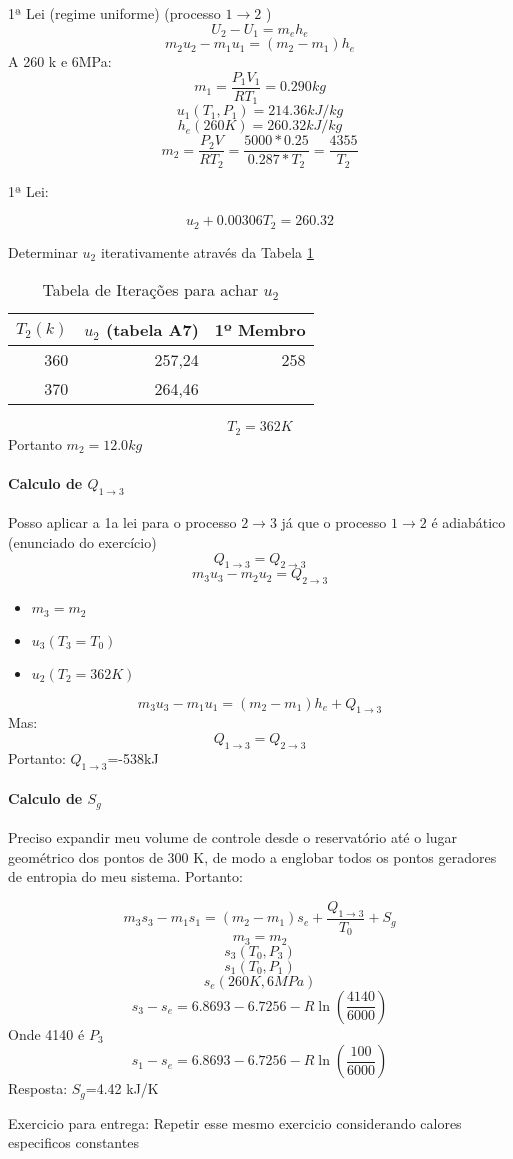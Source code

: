 
1ª Lei (regime uniforme) (processo $1 \rightarrow 2$ )
\[U_{2}-U_{1}=m_{e}h_{e}\]
\[m_{2}u_{2}-m_{1}u_{1}=(m_{2}-m_{1})h_{e}\]
A 260 k e 6MPa:
\[m_{1}=\frac{P_{1}V_{1}}{RT_{1}}=0.290kg\]
\[u_{1}(T_{1},P_{1})=214.36kJ/kg\]
\[h_{e}(260K)=260.32kJ/kg\]
\[m_{2}=\frac{P_{2}V}{RT_{2}}=\frac{5000*0.25}{0.287*T_{2}}=\frac{4355}{T_{2}}\]

1ª Lei:

\[u_{2}+0.00306 T_{2}=260.32\]

Determinar $u_{2}$ iterativamente através da Tabela \ref{tab:tab1}
\begin{table}[htbp]
  \centering
  \caption{Tabela de Iterações para achar $u_{2}$}
    \begin{tabular}{rrr}
    \toprule
    $T_{2}(k)$ & $u_{2}$ (tabela A7) & 1º Membro \\
    \midrule
    360   & 257,24 & 258 \\
    370   & 264,46 &  \\
    \bottomrule
    \end{tabular}%
  \label{tab:tab1}%
\end{table}%

 \[ T_{2}=362 K\]
Portanto $m_{2}=12.0kg$

\paragraph*{Calculo de $Q_{1 \rightarrow 3}$}

Posso aplicar a 1a lei para o processo $2 \rightarrow 3$ já que o processo $1 \rightarrow 2$ é adiabático (enunciado do exercício)
\[Q_{1 \rightarrow 3} = Q_{2 \rightarrow 3}\]
\[m_{3}u_{3}-m_{2}u_{2}=Q_{2 \rightarrow 3}\]
\begin{itemize}
\item $m_{3}=m_{2}$
\item $u_{3}(T_{3}=T_{0})$
\item $u_{2}(T_{2}=362 K)$
\end{itemize}

\[m_{3}u_{3}-m_{1}u_{1}=(m_{2}-m_{1})h_{e}+Q_{1 \rightarrow 3}\]
Mas:
\[Q_{1 \rightarrow 3} = Q_{2 \rightarrow 3}\]
Portanto: $Q_{1 \rightarrow 3}$=-538kJ

\paragraph*{Calculo de $S_{g}$}

Preciso expandir meu volume de controle desde o reservatório até o lugar geométrico dos pontos de 300 K, de modo a englobar todos os pontos geradores de entropia do meu sistema.
Portanto:

\[m_{3}s_{3}-m_{1}s_{1}=(m_{2}-m_{1})s_{e}+\frac{Q_{1 \rightarrow 3}}{T_{0}}+S_{g}\]
\[m_{3}=m_{2}\]
\[s_{3}(T_{0},P_{3})\]
\[s_{1}(T_{0},P_{1})\]
\[s_{e}(260K,6MPa)\]
\[s_{3}-s_{e}=6.8693-6.7256-R\ln(\frac{4140}{6000})\]
Onde 4140 é $P_{3}$
\[s_{1}-s_{e}=6.8693-6.7256-R\ln(\frac{100}{6000})\]
Resposta: $S_{g}$=4.42 kJ/K


Exercicio para entrega: Repetir esse mesmo exercicio considerando calores especificos constantes